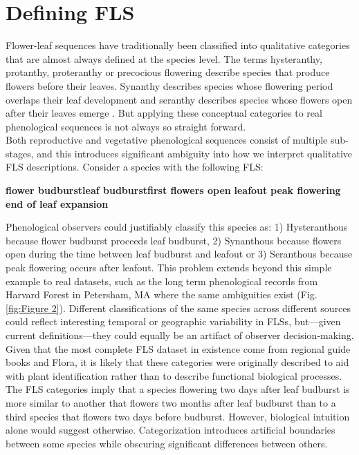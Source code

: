\documentclass[12pt]{article}
\begin{document}
\section*{Defining FLS}
\indent\indent Flower-leaf sequences have traditionally been classified into qualitative categories that are almost always defined at the species level. The terms hysteranthy, protanthy, proteranthy or precocious flowering describe species that produce flowers before their leaves. Synanthy describes species whose flowering period overlaps their leaf development and seranthy describes species whose flowers open after their leaves emerge \citep{Lamont2011, Heinig1899}. But applying these conceptual categories to real phenological sequences is not always so straight forward.\\

\indent Both reproductive and vegetative phenological sequences consist of multiple sub-stages, and this introduces significant ambiguity into how we interpret qualitative FLS descriptions. Consider a species with the following FLS:\\
\begin{center}
\textbf{flower budburst}\rightarrow \textbf{leaf budburst}\rightarrow \textbf{first flowers open} \rightarrow \textbf{leafout} \rightarrow \textbf{peak flowering} \rightarrow \textbf{end of leaf expansion}\\
\end{center}

\noindent Phenological observers could justifiably classify this species as: 1) Hysteranthous because flower budburst proceeds leaf budburst, 2) Synanthous because flowers open during the time between leaf budburst and leafout or 3) Seranthous because peak flowering occurs after leafout. This problem extends beyond this simple example to real datasets, such as the long term phenological records from Harvard Forest in Petersham, MA \citep{OKeefe2015} where the same ambiguities exist (Fig. \ref{fig:Figure 2}). Different classifications of the same species across different sources could reflect interesting temporal or geographic variability in FLSs, but---given current definitions---they could equally be an artifact of observer decision-making.\\

\indent Given that the most complete FLS dataset in existence come from regional guide books and Flora, it is likely that these categories were originally described to aid with plant identification rather than to describe functional biological processes. The FLS categories imply that a species flowering two days after leaf budburst is more similar to another that flowers two months after leaf budburst than to a third species that flowers two days before budburst. However, biological intuition alone would suggest otherwise. %
Categorization introduces artificial boundaries between some species while obscuring significant differences between others. \\
\end{document}
